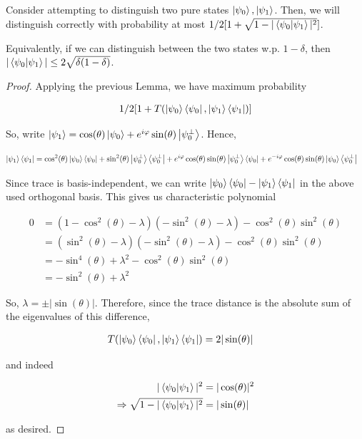 \documentclass[main.tex]{subfiles}
\begin{document}
\begin{corollary}
\label{cor:distinguish-two-pure-states}
Consider attempting to distinguish two pure states $\ket{\psi_0}, \ket{\psi_1}$. Then, we will distinguish correctly with probability at most $1/2[1 + \sqrt{1 - |\bra{\psi_0}\ket{\psi_1}|^2}]$.

Equivalently, if we can distinguish between the two states w.p. $1 - \delta$, then $|\bra{\psi_0}\ket{\psi_1}| \leq 2\sqrt{\delta(1-\delta)}$.
\end{corollary}

\begin{proof}
Applying the previous Lemma, we have maximum probability

\begin{align*}
1/2[1 + T(\ket{\psi_0}\bra{\psi_0}, \ket{\psi_1}\bra{\psi_1}	)]
\end{align*}

So, write $\ket{\psi_1} = \cos(\theta) \ket{\psi_0} + e^{i\varphi}\sin(\theta)\ket{\psi_0^\perp}$. Hence,

\begin{align*}
\ket{\psi_1}\bra{\psi_1}	 &= \cos^2(\theta) \ket{\psi_0}\bra{\psi_0} + \sin^2(\theta)\ket{\psi_0^\perp}\bra{\psi_0^\perp}
+ e^{i\varphi}\cos(\theta)\sin(\theta)\ket{\psi_0^\perp}\bra{\psi_0} + e^{-i\varphi}\cos(\theta)\sin(\theta)\ket{\psi_0}\bra{\psi_0^\perp}
\end{align*}

Since trace is basis-independent, we can write $\ket{\psi_0}\bra{\psi_0} - \ket{\psi_1}\bra{\psi_1}$ in the above used orthogonal basis. This gives us characteristic polynomial

\begin{align*}
	0 &= (1-\cos^2(\theta) - \lambda)(-\sin^2(\theta) - \lambda) - \cos^2(\theta)\sin^2(\theta)\\
	&= (\sin^2(\theta) - \lambda)(-\sin^2(\theta) - \lambda) - \cos^2(\theta)\sin^2(\theta) \\
	&= -\sin^4(\theta) + \lambda^2 - \cos^2(\theta)\sin^2(\theta) \\
	&= -\sin^2(\theta) + \lambda^2
\end{align*}

 So, $\lambda = \pm |\sin(\theta)|$. Therefore, since the trace distance is the absolute sum of the eigenvalues of this difference,

\begin{align*}
T(\ket{\psi_0}\bra{\psi_0}, \ket{\psi_1}\bra{\psi_1}	) &= 2|\sin(\theta)|
\end{align*}

and indeed

\begin{align*}
|\bra{\psi_0}\ket{\psi_1}|^2 &= |\cos(\theta)|^2\\
\Rightarrow \sqrt{1 - |\bra{\psi_0}\ket{\psi_1}|^2} &= |\sin(\theta)|
\end{align*}

as desired.
\end{proof}
\end{document}
